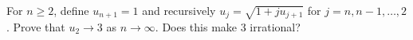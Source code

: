 For $n\ge2$, define $u_{n+1}=1$ and recursively $u_j=\sqrt{1+j u_{j+1}}$ for $j=n,n-1,\ldots,2$. Prove that $u_2\to3$ as $n\to\infty$. Does this make 3 irrational?
